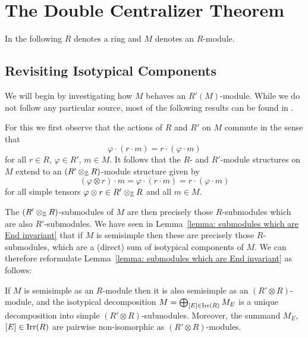 \section{The Double Centralizer Theorem}


\begin{conventions}
  In the following $R$ denotes a ring and $M$ denotes an $R$-module.
\end{conventions}





\subsection{Revisiting Isotypical Components}


\begin{fluff}
  We will begin by investigating how $M$ behaves an $R'(M)$-module.
  While we do not follow any particular source, most of the following results can be found in \cite[Chapter~3.2]{DaSilva2017NonCommutative}.
  
  For this we first observe that the actions of $R$ and $R'$ on $M$ commute in the sense that
  \[
      \varphi \cdot (r \cdot m)
    = r \cdot (\varphi \cdot m)
  \]
  for all $r \in R$, $\varphi \in R'$, $m \in M$.
  It follows that the $R$- and $R'$-module structures on $M$ extend to an $(R' \otimes_{\mathbb{Z}} R)$-module structure given by
  \[
      (\varphi \otimes r) \cdot m
    = \varphi \cdot (r \cdot m)
    = r \cdot (\varphi \cdot m)
  \]
  for all simple tensors $\varphi \otimes r \in R' \otimes_{\mathbb{Z}} R$ and all $m \in M$.
  
  The $(R' \otimes_{\mathbb{Z}} R)$-submodules of $M$ are then precisely those $R$-submodules which are also $R'$-submodules.
  We have seen in Lemma~\ref{lemma: submodules which are End invariant} that if $M$ is semisimple then these are precisely those $R$-submodules, which are a (direct) sum of isotypical components of $M$.
  We can therefore reformulate Lemma~\ref{lemma: submodules which are End invariant} as follows:
\end{fluff}


\begin{lemma}
  \label{lemma: unique decomposition into simple R' tensor R modules}
  If $M$ is semisimple as an $R$-module then it is also semisimple as an $(R' \otimes R)$-module, and the isotypical decomposition $M = \bigoplus_{[E] \in \operatorname{Irr}(R)} M_E$ is a unique decomposition into simple $(R' \otimes R)$-submodules.
  Moreover, the summand $M_E$, $[E] \in \operatorname{Irr}(R)$ are pairwise non-isomorphic as $(R' \otimes R)$-modules.
\end{lemma}


